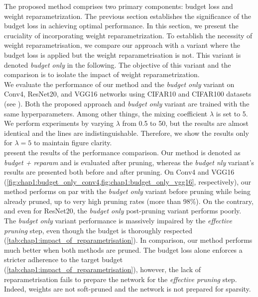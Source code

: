 
The proposed method comprises two primary components: budget loss and weight
reparametrization. The previous section establishes the significance of the
budget loss in achieving optimal performance. In this section, we present the
cruciality of incorporating weight reparametrization. To establish the necessity
of weight reparametrisation, we compare our approach with a variant where the
budget loss is applied but the weight reparametrisation is not. This variant is
denoted \emph{budget only} in the following. The objective of this variant and
the comparison is to isolate the impact of weight reparametrization.\\


We evaluate the performance of our method and the \emph{budget only} variant on
Conv4, ResNet20, and VGG16 networks using CIFAR10 and CIFAR100 datasets (see
).
Both the proposed approach and \emph{budget only} variant are trained with the
same hyperparameters. Among other things, the mixing coefficient $\lambda$ is
set to 5. We perform experiments by varying $\lambda$ from 0.5 to 50, but the
results are almost identical and the lines are indistinguishable. Therefore, we
show the results only for $\lambda = 5$ to maintain figure clarity.\\

present the results of the performance comparison. Our method is denoted as
\emph{budget + reparam} and is evaluated after pruning, whereas the \emph{budget
nly} variant's results are presented both before and after pruning. On Conv4 and
VGG16 (\cref{fig:chap1:budget_only_conv4,fig:chap1:budget_only_vgg16},
respectively), our method performs on par with the \emph{budget only} variant
before pruning while being already pruned, up to very high pruning rates (more
than 98\%). On the contrary, and even for ResNet20, the \emph{budget only}
post-pruning variant performs poorly. The \emph{budget only} variant performance
is massively impaired by the \emph{effective pruning} step, even though the
budget is thoroughly respected (\cref{tab:chap1:impact_of_reparametrisation}).
In comparison, our method performs much better when both methods are pruned. The
budget loss alone enforces a stricter adherence to the target budget
(\cref{tab:chap1:impact_of_reparametrisation}), however, the lack of
reparametrisation fails to prepare the network for the \emph{effective pruning}
step. Indeed, weights are not soft-pruned and the network is not prepared for sparsity.\\

